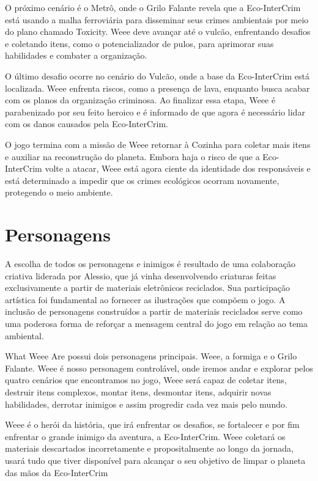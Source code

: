 O próximo cenário é o Metrô, onde o Grilo Falante revela que a Eco-InterCrim está usando a malha ferroviária para disseminar seus crimes ambientais por meio do plano chamado Toxicity. Weee deve avançar até o vulcão, enfrentando desafios e coletando itens, como o potencializador de pulos, para aprimorar suas habilidades e combater a organização.

O último desafio ocorre no cenário do Vulcão, onde a base da Eco-InterCrim está localizada. Weee enfrenta riscos, como a presença de lava, enquanto busca acabar com os planos da organização criminosa. Ao finalizar essa etapa, Weee é parabenizado por seu feito heroico e é informado de que agora é necessário lidar com os danos causados pela Eco-InterCrim.

O jogo termina com a missão de Weee retornar à Cozinha para coletar mais itens e auxiliar na reconstrução do planeta. Embora haja o risco de que a Eco-InterCrim volte a atacar, Weee está agora ciente da identidade dos responsáveis e está determinado a impedir que os crimes ecológicos ocorram novamente, protegendo o meio ambiente.

\section{Personagens}
A escolha de todos os personagens e inimigos é resultado de uma colaboração criativa liderada por Alessio, que já vinha desenvolvendo criaturas feitas exclusivamente a partir de materiais eletrônicos reciclados. Sua participação artística foi fundamental ao fornecer as ilustrações que compõem o jogo. A inclusão de personagens construídos a partir de materiais reciclados serve como uma poderosa forma de reforçar a mensagem central do jogo em relação ao tema ambiental.

What Weee Are possui dois personagens principais. Weee, a formiga e o Grilo Falante. Weee é nosso personagem controlável, onde iremos andar e explorar pelos quatro cenários que encontramos no jogo, Weee será capaz de coletar itens, destruir itens complexos, montar itens, desmontar itens, adquirir novas habilidades, derrotar inimigos e assim progredir cada vez mais pelo mundo.

Weee é o herói da história, que irá enfrentar os desafios, se fortalecer e por fim enfrentar o grande inimigo da aventura, a Eco-InterCrim. Weee coletará os materiais descartados incorretamente e propositalmente ao longo da jornada, usará tudo que tiver disponível para alcançar o seu objetivo de limpar o planeta das mãos da Eco-InterCrim

